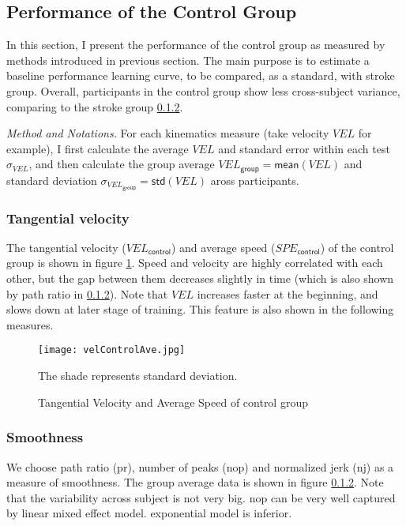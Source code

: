 \subsection{Performance of the Control Group}

In this section, I present the performance of the control group as measured by methods introduced in previous section. The main purpose is to estimate a baseline performance learning curve, to be compared, as a standard, with stroke group. Overall, participants in the control group show less cross-subject variance, comparing to the stroke group \ref{}. 

\textit{Method and Notations.} For each kinematics measure (take velocity $VEL$ for example), I first calculate the average $VEL$ and standard error within each test $\sigma_{VEL}$, and then calculate the group average $VEL_\textsf{group} = \textsf{mean}(VEL)$ and standard deviation $\sigma_{VEL_\textsf{group}} = \textsf{std}(VEL)$ aross participants.

\subsubsection{Tangential velocity}
The tangential velocity ($VEL_\textsf{control}$) and average speed ($SPE_\textsf{control}$) of the control group is shown in figure \ref{fig:velControlAve}. Speed and velocity are highly correlated with each other, but the gap between them decreases slightly in time (which is also shown by path ratio in \ref{}). Note that $VEL$ increases faster at the beginning, and slows down at later stage of training. This feature is also shown in the following measures.

\begin{figure}
	\texttt{[image: velControlAve.jpg]}
	\centering
	\caption{Tangential Velocity and Average Speed of control group}
	\medskip
	\small The shade represents standard deviation.
	\label{fig:velControlAve}
\end{figure}

\subsubsection{Smoothness}
We choose path ratio (pr), number of peaks (nop) and normalized jerk (nj) as a measure of smoothness. The group average data is shown in figure \ref{}. Note that the variability across subject is not very big. nop can be very well captured by linear mixed effect model. exponential model is inferior. 

